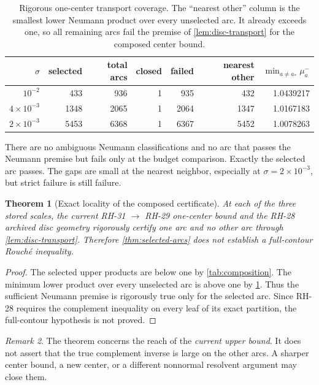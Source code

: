 \documentclass[11pt]{article}
\newtheorem{theorem}{Theorem}[section]
\theoremstyle{definition}
\theoremstyle{remark}
\newtheorem{remark}[theorem]{Remark}
\begin{document}
\begin{table}[H]
\centering
\caption{Rigorous one-center transport coverage.  The ``nearest other''
column is the smallest lower Neumann product over every unselected arc.  It
already exceeds one, so all remaining arcs fail the premise of
\cref{lem:disc-transport} for the composed center bound.}
\label{tab:coverage}
\begin{tabular}{rrrrrrr}
\toprule
$\sigma$ & selected & total arcs & closed & failed & nearest other &
$\min_{a\ne a_*}\mu_a^-$\\
\midrule
$10^{-2}$ & 433 & 936 & 1 & 935 & 432 & 1.0439217\\
$4\times10^{-3}$ & 1348 & 2065 & 1 & 2064 & 1347 & 1.0167183\\
$2\times10^{-3}$ & 5453 & 6368 & 1 & 6367 & 5452 & 1.0078263\\
\bottomrule
\end{tabular}
\end{table}

There are no ambiguous Neumann classifications and no arc that passes the
Neumann premise but fails only at the budget comparison.  Exactly the
selected arc passes.  The gaps are small at the nearest neighbor, especially
at $\sigma=2\times10^{-3}$, but strict failure is still failure.

\begin{theorem}[Exact locality of the composed certificate]
\label{thm:locality}
At each of the three stored scales, the current RH-31 $\to$ RH-29
one-center bound and the RH-28 archived disc geometry rigorously certify one
arc and no other arc through \cref{lem:disc-transport}.  Therefore
\cref{thm:selected-arcs} does not establish a full-contour Rouch\'e
inequality.
\end{theorem}

\begin{proof}
The selected upper products are below one by
\cref{tab:composition}.  The minimum lower product over every unselected
arc is above one by \cref{tab:coverage}.  Thus the sufficient Neumann
premise is rigorously true only for the selected arc.  Since RH-28 requires
the complement inequality on every leaf of its exact partition, the
full-contour hypothesis is not proved.
\end{proof}

\begin{remark}
The theorem concerns the reach of the \emph{current upper bound}.  It does
not assert that the true complement inverse is large on the other arcs.  A
sharper center bound, a new center, or a different nonnormal resolvent
argument may close them.
\end{remark}
\end{document}
